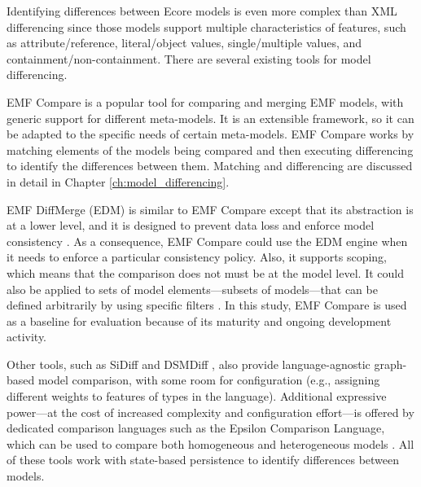 Identifying differences between Ecore models is even more complex than XML differencing since those models support multiple characteristics of features, such as attribute/reference, literal/object values, single/multiple values, and containment/non-containment\cite{steinberg2008emf}. There are several existing tools for model differencing. 

EMF Compare \cite{emfcompare2018developer} is a popular tool for comparing and merging EMF models, with generic support for different meta-models. It is an extensible framework, so it can be adapted to the specific needs of certain meta-models. EMF Compare works by matching elements of the models being compared and then executing differencing to identify the differences between them. Matching and differencing are discussed in detail in Chapter \ref{ch:model_differencing}. 

EMF DiffMerge (EDM) \cite{eclipse2019emfdiffmerge} is similar to EMF Compare except that its abstraction is at a lower level, and it is designed to prevent data loss and enforce model consistency \cite{eclipse2019emfdiffmerge2}. As a consequence, EMF Compare could use the EDM engine when it needs to enforce a particular consistency policy. Also, it supports scoping, which means that the comparison does not must be at the model level. It could also be applied to sets of model elements—subsets of models—that can be defined arbitrarily by using specific filters \cite{jaxenter2019emfdiffmerge}. In this study, EMF Compare is used as a baseline for evaluation because of its maturity and ongoing development activity. 

Other tools, such as SiDiff \cite{Treude2007SiDiff} and DSMDiff \cite{lin2009dsmdiff}, also provide language-agnostic graph-based model comparison, with some room for configuration (e.g., assigning different weights to features of types in the language). Additional expressive power—at the cost of increased complexity and configuration effort—is offered by dedicated comparison languages such as the Epsilon Comparison Language, which can be used to compare both homogeneous and heterogeneous models \cite{kolovos2009ecl}. All of these tools work with state-based persistence to identify differences between models.

